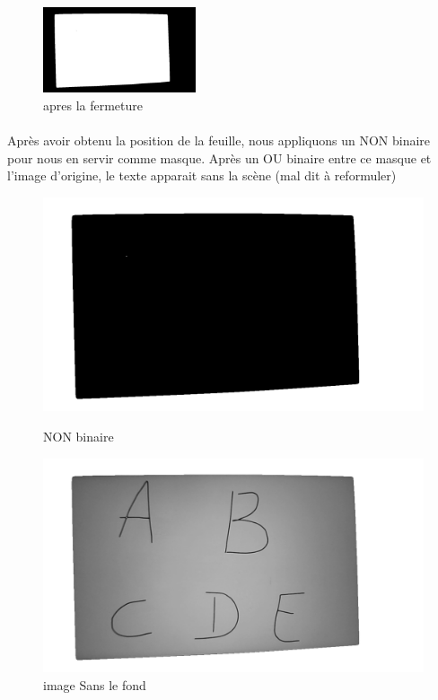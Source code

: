 \documentclass[a4paper]{article}
\begin{document}
				\begin{figure}[h]
					\centering
					\includegraphics[width=0.4\textwidth]{apresFermeture.png}
					\caption{apres la fermeture}
					\label{fig:apresFermeture}
				\end{figure}

				\paragraph{} Après avoir obtenu la position de la feuille, nous appliquons un NON binaire pour nous en servir comme masque. Après un OU binaire entre ce masque et l'image d'origine, le texte apparait sans la scène (mal dit à reformuler)



				\begin{figure}[h]
					\centering
					\begin{minipage}{.5\textwidth}
					  \centering
					  \includegraphics[width=.8\linewidth]{nonBinaireOtsu.png}
					  \caption{NON binaire}
					  \label{fig:nonBinaireOtsu}
					\end{minipage}%
					\begin{minipage}{.5\textwidth}
					  \centering
					  \includegraphics[width=.8\linewidth]{imageSansFond.png}
					  \caption{image Sans le fond}
					  \label{fig:imageSansFond}
					\end{minipage}
				\end{figure}
\end{document}
